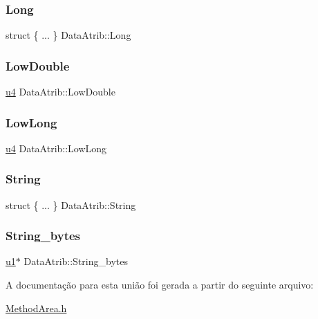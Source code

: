 \subsubsection{\texorpdfstring{Long}{Long}}
{\footnotesize\ttfamily struct \{ ... \}  Data\+Atrib\+::\+Long}

\mbox{\label{unionDataAtrib_a1f6e08d1c97fee36f6b0f92d7b985933}} 
\subsubsection{\texorpdfstring{Low\+Double}{LowDouble}}
{\footnotesize\ttfamily \hyperlink{ClassLoader_8h_aedf6ddc03df8caaaccbb4c60b9a9b850}{u4} Data\+Atrib\+::\+Low\+Double}

\mbox{\label{unionDataAtrib_abb7703b7239c1c10a4f0dd2564af85cf}} 
\subsubsection{\texorpdfstring{Low\+Long}{LowLong}}
{\footnotesize\ttfamily \hyperlink{ClassLoader_8h_aedf6ddc03df8caaaccbb4c60b9a9b850}{u4} Data\+Atrib\+::\+Low\+Long}

\mbox{\label{unionDataAtrib_a2d7e4f85a56b23c89a93ca99c6dcefaf}} 
\subsubsection{\texorpdfstring{String}{String}}
{\footnotesize\ttfamily struct \{ ... \}  Data\+Atrib\+::\+String}

\mbox{\label{unionDataAtrib_a6ed5174c66346d1713654b70b363eef7}} 
\subsubsection{\texorpdfstring{String\+\_\+bytes}{String\_bytes}}
{\footnotesize\ttfamily \hyperlink{ClassLoader_8h_a216a9f8b04b4f0af84a4ca9d1d85a6ca}{u1}$\ast$ Data\+Atrib\+::\+String\+\_\+bytes}



A documentação para esta união foi gerada a partir do seguinte arquivo\+:\begin{DoxyCompactItemize}
\item 
\hyperlink{MethodArea_8h}{Method\+Area.\+h}\end{DoxyCompactItemize}
